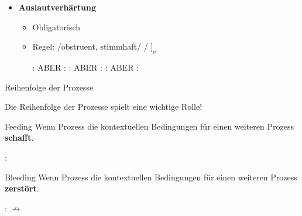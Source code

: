 \begin{frame}

\begin{itemize}
	\item \textbf{Auslautverhärtung}

	\begin{itemize}
		\item Obligatorisch
		\item Regel: /obstruent, stimmhaft/  / \underline{\quad} $]_\sigma$

	\eal
		\ex {}:  \ras \textipa{[ba:t]}
		\ex ABER :  \ras \textipa{[bE:.d5]}
		\ex {}:  \ras \textipa{[Po.li:f]}
		\ex ABER :  \ras \textipa{[Po.li:.v@]}
		\ex {}:  \ras {}
		\ex ABER :  \ras \textipa{[PEn.d@]}
	\zl
	
	\end{itemize}

\end{itemize}

\end{frame}



\begin{frame}{Reihenfolge der Prozesse}

Die Reihenfolge der Prozesse spielt eine wichtige Rolle!

	\begin{block}{Feeding}
	Wenn Prozess die kontextuellen Bedingungen für einen weiteren Prozess \textbf{schafft}.	

	\end{block}

	\ea {}:  \ras \textipa{[ha:k\textsyllabic{n}]} \ras \textipa{[ha:k\textsyllabic{N}]}
	\z

	\begin{block}{Bleeding}
	Wenn Prozess die kontextuellen Bedingungen für einen weiteren Prozess \textbf{zerstört}.
	\end{block}

	\ea {}:  \ras \textipa{[g@.zaNg]} \ras \textipa{[g@.zaN]} $\nrightarrow$ \textipa{[g@.zaNk]}
	\z
	

\end{frame}



